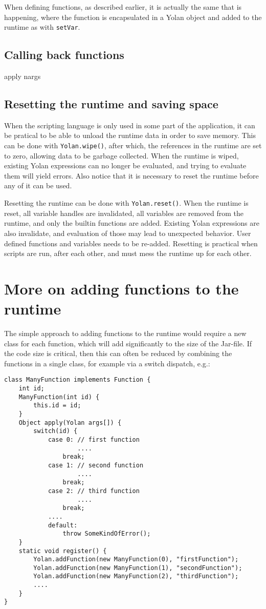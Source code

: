 When defining functions, as described earlier, it is actually the same that is happening, where the function is encapsulated in a Yolan object and added to the runtime as with \verb|setVar|.
\subsection{Calling back functions}
apply nargs
\subsection{Resetting the runtime and saving space}
When the scripting language is only used in some part of the application, it can be pratical to be able to unload the runtime data in order to save memory. This can be done with \verb|Yolan.wipe()|, after which, the references in the runtime are set to zero, allowing data to be garbage collected.
When the runtime is wiped, existing Yolan expressions can no longer be evaluated, and trying to evaluate them will yield errors. Also notice that it is necessary to reset the runtime before any of it can be used.

Resetting the runtime can be done with \verb|Yolan.reset()|. When the runtime is reset, all variable handles are invalidated, all variables are removed from the runtime, and only the builtin functions are added. Existing Yolan expressions are also invalidate, and evaluation of those may lead to unexpected behavior. User defined functions and variables needs to be re-added.
Resetting is practical when scripts are run, after each other, and must mess the runtime up for each other.

\section{More on adding functions to the runtime}

The simple approach to adding functions to the runtime would require a new class for each function, which will add significantly to the size of the Jar-file.
If the code size is critical, then this can often be reduced by combining the functions in a single class, for example via a switch dispatch, e.g.:
{\scriptsize 
\begin{verbatim}
class ManyFunction implements Function {
    int id;
    ManyFunction(int id) {
        this.id = id;
    }
    Object apply(Yolan args[]) {
        switch(id) {
            case 0: // first function
                    ....
                break;
            case 1: // second function
                    ....
                break;
            case 2: // third function
                    ....
                break;
            ....
            default:
                throw SomeKindOfError();
    }
    static void register() {
        Yolan.addFunction(new ManyFunction(0), "firstFunction");
        Yolan.addFunction(new ManyFunction(1), "secondFunction");
        Yolan.addFunction(new ManyFunction(2), "thirdFunction");
        ....
    }
}
\end{verbatim}
}

